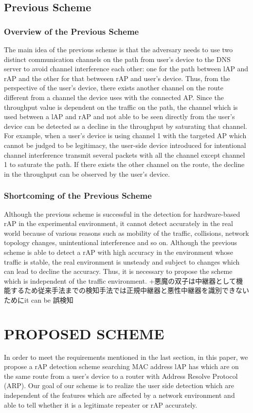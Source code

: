 \documentclass[conference]{IEEEtran}
\begin{document}
\subsection{Previous Scheme}
\subsubsection{Overview of the Previous Scheme}
The main idea of the previous scheme \cite{previous} is that the adversary needs to use two distinct communication channels on the path from user's device to the DNS server to avoid channel interference each other: one for the path between lAP and rAP and the other for that betweeen rAP and user's device.
Thus, from the perspective of the user's device, there exists another channel on the route different from a channel the device uses with the connected AP. 
Since the throughput value is dependent on the traffic on the path, the channel which is used between a lAP and rAP and not able to be seen directly from the user's device can be detected as a decline in the throughput by saturating that channel.
For example, when a user's device is using channel 1 with the targeted AP which cannot be judged to be legitimacy, the user-side device introduced for intentional channel interference transmit several packets with all the channel except channel 1 to saturate the path.
If there exists the other channel on the route, the decline in the throughput can be observed by the user's device.

\subsubsection{Shortcoming of the Previous Scheme}
Although the previous scheme is successful in the detection for hardware-based rAP in the experimental environment, it cannot detect accurately in the real world because of various reasons such as mobility of the traffic, collisions, network topology changes, unintentional interference and so on.
Although the previous scheme is able to detect a rAP with high accuracy in the environment whose traffic is stable, the real environment is unsteady and subject to changes which can lead to decline the accuracy.
Thus, it is necessary to propose the scheme which is independent of the traffic environment. 
+悪魔の双子は中継器として機能するため従来手法までの検知手法では正規中継器と悪性中継器を識別できないためにit can be 誤検知


\section{PROPOSED SCHEME}
In order to meet the requirements mentioned in the last section, in this paper, we propose a rAP detection scheme searching MAC address lAP has which are on the same route from a user's device to a router with Address Resolve Protocol (ARP).  
Our goal of our scheme is to realize the user side detection which are independent of the features which are affected by a network environment and able to tell whether it is a legitimate repeater or rAP accurately.
\end{document}
